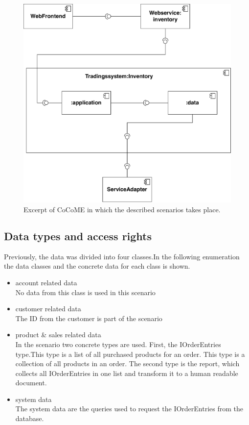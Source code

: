 \begin{figure}
\includegraphics[scale=0.8]{logos/ExcerptUC13.pdf}
\caption{Excerpt of CoCoME in which the described scenarios takes place.}
\label{scn_excerpt}
\end{figure}

\subsection{Data types and access rights} 
\label{accesscontrol_casestudy}

Previously, the data was divided into four classes.In the following enumeration the data classes and the concrete data for each class is shown.\\
\begin{itemize}
\item account related data \\ No data from this class is used in this scenario
\item customer related data\\ The ID from the customer is part of the scenario
\item product \& sales related data\\ In the scenario two concrete types are used. First, the IOrderEntries type.This type is a list of all purchased products for an order. This type is a collection of all products in an order. The second type is the report, which collects all IOrderEntries in one list and transform it to a human readable document. 
\item system data \\ The system data are the queries used to request the IOrderEntries from the database.
\end{itemize}


